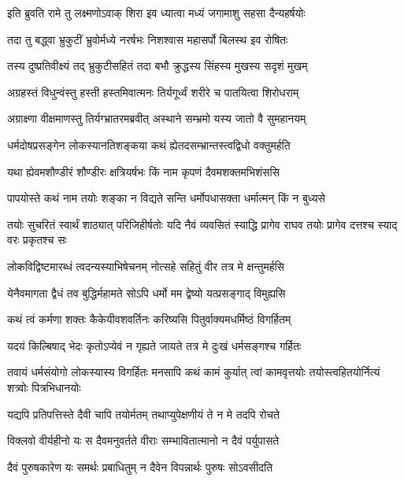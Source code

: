 
\twolineshloka
{इति ब्रुवति रामे तु लक्ष्मणोऽवाक् शिरा इव}
{ध्यात्वा मध्यं जगामाशु सहसा दैन्यहर्षयोः} %

\twolineshloka
{तदा तु बद्ध्वा भ्रुकुटीं भ्रुवोर्मध्ये नरर्षभः}
{निशश्वास महासर्पो बिलस्थ इव रोषितः} %

\twolineshloka
{तस्य दुष्प्रतिवीक्ष्यं तद् भ्रुकुटीसहितं तदा}
{बभौ क्रुद्धस्य सिंहस्य मुखस्य सदृशं मुखम्} %

\twolineshloka
{अग्रहस्तं विधुन्वंस्तु हस्ती हस्तमिवात्मनः}
{तिर्यगूर्ध्वं शरीरे च पातयित्वा शिरोधराम्} %

\twolineshloka
{अग्राक्ष्णा वीक्षमाणस्तु तिर्यग्भ्रातरमब्रवीत्}
{अस्थाने सम्भ्रमो यस्य जातो वै सुमहानयम्} %

\twolineshloka
{धर्मदोषप्रसङ्गेन लोकस्यानतिशङ्कया}
{कथं ह्येतदसम्भ्रान्तस्त्वद्विधो वक्तुमर्हति} %

\twolineshloka
{यथा ह्येवमशौण्डीरं शौण्डीरः क्षत्रियर्षभः}
{किं नाम कृपणं दैवमशक्तमभिशंससि} %

\twolineshloka
{पापयोस्ते कथं नाम तयोः शङ्का न विद्यते}
{सन्ति धर्मोपधासक्ता धर्मात्मन् किं न बुध्यसे} %

\threelineshloka
{तयोः सुचरितं स्वार्थं शाठ्यात् परिजिहीर्षतोः}
{यदि नैवं व्यवसितं स्याद्धि प्रागेव राघव}
{तयोः प्रागेव दत्तश्च स्याद् वरः प्रकृतश्च सः} %

\twolineshloka
{लोकविद्विष्टमारब्धं त्वदन्यस्याभिषेचनम्}
{नोत्सहे सहितुं वीर तत्र मे क्षन्तुमर्हसि} %

\twolineshloka
{येनैवमागता द्वैधं तव बुद्धिर्महामते}
{सोऽपि धर्मो मम द्वेष्यो यत्प्रसङ्गाद् विमुह्यसि} %

\twolineshloka
{कथं त्वं कर्मणा शक्तः कैकेयीवशवर्तिनः}
{करिष्यसि पितुर्वाक्यमधर्मिष्ठं विगर्हितम्} %

\twolineshloka
{यदयं किल्बिषाद् भेदः कृतोऽप्येवं न गृह्यते}
{जायते तत्र मे दुःखं धर्मसङ्गश्च गर्हितः} %

\threelineshloka
{तवायं धर्मसंयोगो लोकस्यास्य विगर्हितः}
{मनसापि कथं कामं कुर्यात् त्वां कामवृत्तयोः}
{तयोस्त्वहितयोर्नित्यं शत्र्वोः पित्रभिधानयोः} %

\twolineshloka
{यद्यपि प्रतिपत्तिस्ते दैवी चापि तयोर्मतम्}
{तथाप्युपेक्षणीयं ते न मे तदपि रोचते} %

\twolineshloka
{विक्लवो वीर्यहीनो यः स दैवमनुवर्तते}
{वीराः सम्भावितात्मानो न दैवं पर्युपासते} %

\twolineshloka
{दैवं पुरुषकारेण यः समर्थः प्रबाधितुम्}
{न दैवेन विपन्नार्थः पुरुषः सोऽवसीदति} %

